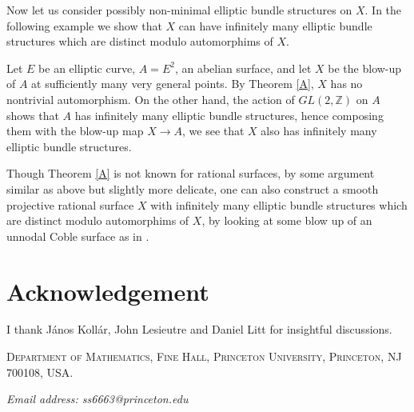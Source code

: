 \documentclass[11pt,letterpaper]{amsart}
\begin{document}
Now let us consider possibly non-minimal elliptic bundle structures on $X$. In the following example we show that $X$ can have infinitely many elliptic bundle structures which are distinct modulo automorphims of $X$.

Let $E$ be an elliptic curve, $A=E^2$, an abelian surface, and let $X$ be the blow-up of $A$ at sufficiently many very general points. By Theorem \ref{A}, $X$ has no nontrivial automorphism. On the other hand, the action of $GL(2,\mathbb{Z})$ on $A$ shows that $A$ has infinitely many elliptic bundle structures, hence composing them with the blow-up map $X\to A$, we see that $X$ also has infinitely many elliptic bundle structures.

Though Theorem \ref{A} is not known for rational surfaces, by some argument similar as above but slightly more delicate, one can also construct a smooth projective rational surface $X$ with infinitely many elliptic bundle structures which are distinct modulo automorphims of $X$, by looking at some blow up of an unnodal Coble surface as in \cite{cantat2012rational}.

\section{Acknowledgement}
I thank János Kollár, John Lesieutre and Daniel Litt for insightful discussions.
\printbibliography
\vspace{40pt}
\begin{flushleft}
{\scshape Department of Mathematics, Fine Hall, Princeton University, Princeton, NJ 700108, USA}.

{\selectfont
\textit{Email address: ss6663@princeton.edu} }
\end{flushleft}
\end{document}
